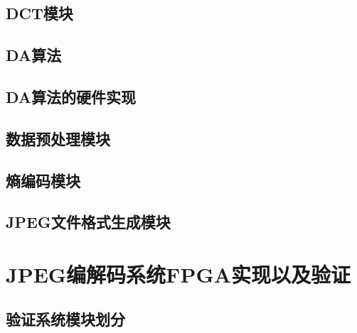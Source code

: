 \documentclass{article}
\numberwithin {equation}{section}
\begin{document}
\begin{spacing}{1.25}
  \subsection{DCT模块}
    \vspace{1em}
    \subsection{DA算法}
      \vspace{1em}
    \subsection{DA算法的硬件实现}
      \vspace{1em}
  \subsection{数据预处理模块}
    \vspace{1em}
  \subsection{熵编码模块}
    \vspace{1em}
  \subsection{JPEG文件格式生成模块}
    \vspace{1em}

\newpage
\section{JPEG编解码系统FPGA实现以及验证}
  \subsection{验证系统模块划分}

\end{spacing}
\end{document}

